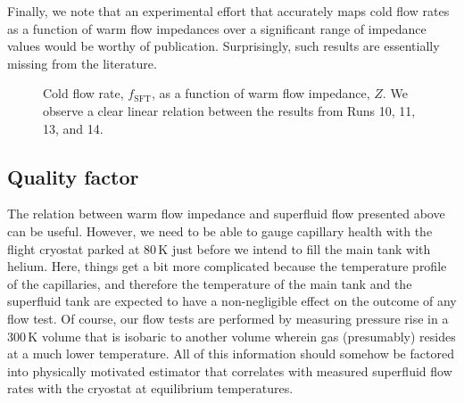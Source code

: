 \documentclass[
12pt, %
letterpaper, %
oneside, %
headinclude, footinclude, %
BCOR5mm, %
]{scrartcl}
\newcommand{\mrm}[1]{\mathrm{#1}}
\begin{document}
Finally, we note that an experimental effort that accurately maps cold flow rates as a function of warm flow impedances over a significant range of impedance values would be worthy of publication. Surprisingly, such results are essentially missing from the literature.

\begin{figure}[t]
\begin{center}
\end{center}
\caption[Cold flow rate vs warm flow impedance]{Cold flow rate, $f_\mrm{SFT}$, as a function of warm flow impedance, $Z$. We observe a clear linear relation between the results from Runs 10, 11, 13, and 14.}
\label{fig:flowvsz}
\end{figure} 

\subsection{Quality factor}
\label{sec:qf}

The relation between warm flow impedance and superfluid flow presented above can be useful. However, we need to be able to gauge capillary health with the flight cryostat parked at 80\,K just before we intend to fill the main tank with helium. Here, things get a bit more complicated because the temperature profile of the capillaries, and therefore the temperature of the main tank and the superfluid tank are expected to have a non-negligible effect on the outcome of any flow test. Of course, our flow tests are performed by measuring pressure rise in a 300\,K volume that is isobaric to another volume wherein gas (presumably) resides at a much lower temperature. All of this information should somehow be factored into physically motivated estimator that correlates with measured superfluid flow rates with the cryostat at equilibrium temperatures.
\end{document}
